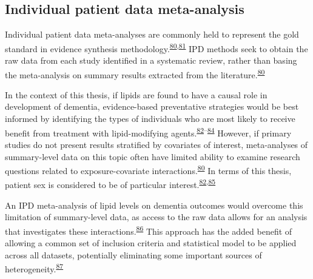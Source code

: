 \documentclass[a4paper, twoside]{templates/ociamthesis}
\begin{document}
\hypertarget{individual-patient-data-meta-analysis}{%
\subsection{Individual patient data meta-analysis}\label{individual-patient-data-meta-analysis}}

Individual patient data meta-analyses are commonly held to represent the gold standard in evidence synthesis methodology.\textsuperscript{\protect\hyperlink{ref-riley2010}{80},\protect\hyperlink{ref-stewart1993}{81}} IPD methods seek to obtain the raw data from each study identified in a systematic review, rather than basing the meta-analysis on summary results extracted from the literature.\textsuperscript{\protect\hyperlink{ref-riley2010}{80}}

In the context of this thesis, if lipids are found to have a causal role in development of dementia, evidence-based preventative strategies would be best informed by identifying the types of individuals who are most likely to receive benefit from treatment with lipid-modifying agents.\textsuperscript{\protect\hyperlink{ref-arain2009}{82}--\protect\hyperlink{ref-mccartney2016}{84}} However, if primary studies do not present results stratified by covariates of interest, meta-analyses of summary-level data on this topic often have limited ability to examine research questions related to exposure-covariate interactions.\textsuperscript{\protect\hyperlink{ref-riley2010}{80}} In terms of this thesis, patient sex is considered to be of particular interest.\textsuperscript{\protect\hyperlink{ref-arain2009}{82},\protect\hyperlink{ref-letenneur1999}{85}}

An IPD meta-analysis of lipid levels on dementia outcomes would overcome this limitation of summary-level data, as access to the raw data allows for an analysis that investigates these interactions.\textsuperscript{\protect\hyperlink{ref-riley2020}{86}} This approach has the added benefit of allowing a common set of inclusion criteria and statistical model to be applied across all datasets, potentially eliminating some important sources of heterogeneity.\textsuperscript{\protect\hyperlink{ref-stewart2002}{87}}
\end{document}
